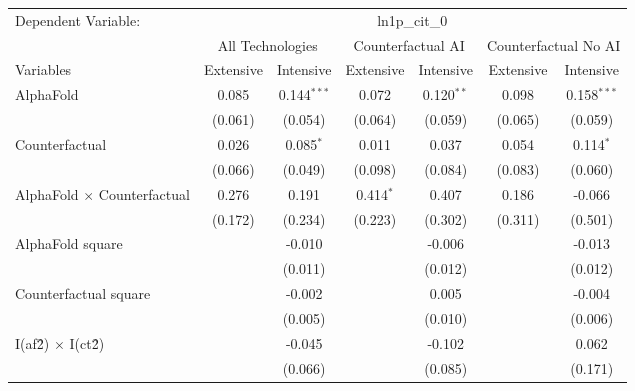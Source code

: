 \begingroup
\centering
\begin{tabular}{lcccccc}
   \tabularnewline \midrule \midrule
   Dependent Variable: & \multicolumn{6}{c}{ln1p\_cit\_0}\\
 & \multicolumn{2}{c}{All Technologies} & \multicolumn{2}{c}{Counterfactual AI} & \multicolumn{2}{c}{Counterfactual No AI} \\
\cmidrule(lr){1-1}\cmidrule(lr){2-3} \cmidrule(lr){4-5} \cmidrule(lr){6-7}
Variables & \multicolumn{1}{c}{Extensive} & \multicolumn{1}{c}{Intensive} & \multicolumn{1}{c}{Extensive} & \multicolumn{1}{c}{Intensive} & \multicolumn{1}{c}{Extensive} & \multicolumn{1}{c}{Intensive} \\
\cmidrule(lr){1-1}\cmidrule(lr){2-2} \cmidrule(lr){3-3} \cmidrule(lr){4-4} \cmidrule(lr){5-5} \cmidrule(lr){6-6} \cmidrule(lr){7-7}
   AlphaFold                          & 0.085   & 0.144$^{***}$ & 0.072       & 0.120$^{**}$ & 0.098   & 0.158$^{***}$\\   
                                      & (0.061) & (0.054)       & (0.064)     & (0.059)      & (0.065) & (0.059)\\   
   Counterfactual                     & 0.026   & 0.085$^{*}$   & 0.011       & 0.037        & 0.054   & 0.114$^{*}$\\   
                                      & (0.066) & (0.049)       & (0.098)     & (0.084)      & (0.083) & (0.060)\\   
   AlphaFold $\times$ Counterfactual  & 0.276   & 0.191         & 0.414$^{*}$ & 0.407        & 0.186   & -0.066\\   
                                      & (0.172) & (0.234)       & (0.223)     & (0.302)      & (0.311) & (0.501)\\   
   AlphaFold square                   &         & -0.010        &             & -0.006       &         & -0.013\\   
                                      &         & (0.011)       &             & (0.012)      &         & (0.012)\\   
   Counterfactual square              &         & -0.002        &             & 0.005        &         & -0.004\\   
                                      &         & (0.005)       &             & (0.010)      &         & (0.006)\\   
   I(af\^2) $\times$ I(ct\^2)         &         & -0.045        &             & -0.102       &         & 0.062\\   
                                      &         & (0.066)       &             & (0.085)      &         & (0.171)\\   

\end{tabular}

